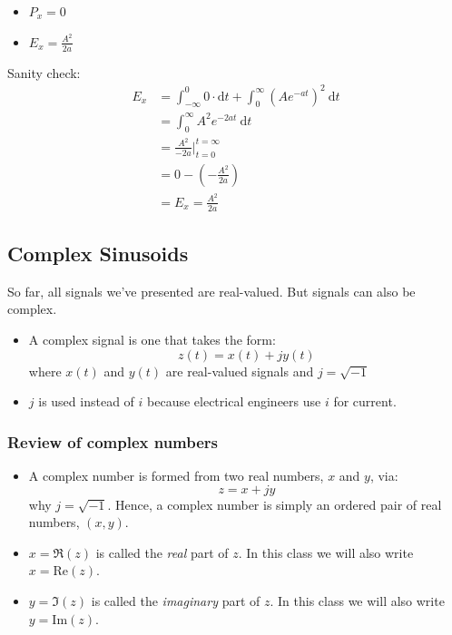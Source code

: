 \documentclass[10pt]{article}
\begin{document}
\begin{itemize}
    \item $P_x = 0$
    \item $E_x = \frac{A^2}{2a}$\\
\end{itemize}
Sanity check:
\begin{align*}
E_x &= \int_{-\infty}^{0} 0 \cdot \text{d}t + \int_0^\infty (Ae^{-at})^2 \:\text{d}t\\
&= \int_0^\infty A^2 e^{-2at} \:\text{d}t\\
&= \frac{A^2}{-2a}\bigg\vert_{t = 0}^{t = \infty}\\
&= 0 - \left(-\frac{A^2}{2a}\right)\\
&= E_x = \frac{A^2}{2a}
\end{align*}

\subsection*{Complex Sinusoids}
So far, all signals we've presented are real-valued.  But signals can also be complex.
\begin{itemize}
    \item A complex signal is one that takes the form:
    \[z(t) = x(t) + jy(t)\]
    where $x(t)$ and $y(t)$ are real-valued signals and $j = \sqrt{-1}$
    \item $j$ is used instead of $i$ because electrical engineers use $i$ for current.
\end{itemize}
\subsubsection*{Review of complex numbers}
\begin{itemize}
    \item A complex number is formed from two real numbers, $x$ and $y$, via:
    \[z = x + jy\]
    why $j = \sqrt{-1}$.  Hence, a complex number is simply an ordered pair of real numbers, $(x, y)$.
    \item $x = \mathfrak{R}(z)$ is called the \textit{real} part of $z$.  In this class we will also write $x = \text{Re}(z)$.
    \item $y = \mathfrak{I}(z)$ is called the \textit{imaginary} part of $z$.  In this class we will also write $y = \text{Im}(z)$.
\end{itemize}
\end{document}
